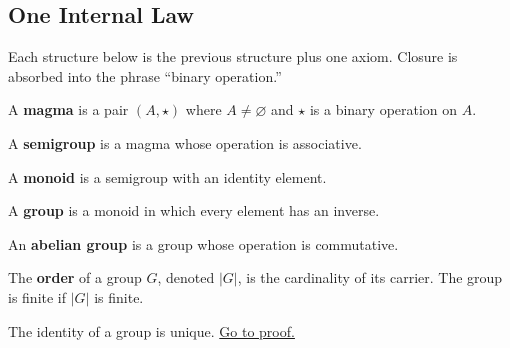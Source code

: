 
\subsection{One Internal Law}
\label{sec:one-internal-law}

\begin{remark*}
Each structure below is the previous structure plus one axiom. Closure is
absorbed into the phrase ``binary operation.''
\end{remark*}

\begin{definition}[Magma]
\label{def:magma}
A \textbf{magma} is a pair $(A,\star)$ where $A\neq\varnothing$ and
$\star$ is a binary operation on $A$.
\end{definition}

\begin{definition}[Semigroup]
\label{def:semigroup}
A \textbf{semigroup} is a magma whose operation is associative.
\end{definition}

\begin{definition}[Monoid]
\label{def:monoid}
A \textbf{monoid} is a semigroup with an identity element.
\end{definition}

\begin{definition}[Group]
\label{def:group}
A \textbf{group} is a monoid in which every element has an inverse.
\end{definition}

\begin{definition}
\label{def:abelian-group}
An \textbf{abelian group} is a group whose operation is commutative.
\end{definition}

\begin{definition}
\label{def:group-order}
The \textbf{order} of a group $G$, denoted $|G|$, is the cardinality of its
carrier. The group is finite if $|G|$ is finite.
\end{definition}

\begin{proposition}
\label{prop:group-identity-unique}
The identity of a group is unique.
\hyperref[prf:group-identity-unique]{Go to proof.}
\end{proposition}

